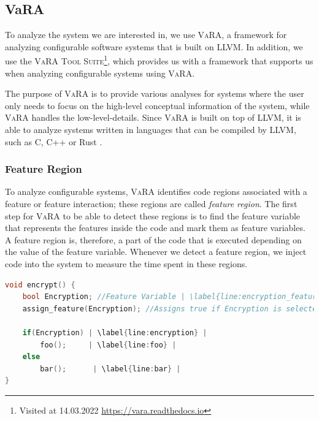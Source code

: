 \subsection{VaRA}\label{VaRA}
To analyze the system we are interested in, we use \textsc{VaRA}, a framework for analyzing configurable software systems that is built on \textsc{LLVM}.
In addition, we use the \textsc{VaRA Tool Suite}\footnote{Visited at 14.03.2022 \url{https://vara.readthedocs.io}}, which provides us with a framework that supports
us when analyzing configurable systems using \textsc{VaRA}.
    
The purpose of \textsc{VaRA} is to provide various analyses for systems where the user only needs to focus on the high-level conceptual information of the 
system, while \textsc{VaRA} handles the low-level-details. 
Since \textsc{VaRA} is built on top of \textsc{LLVM}, it is able to analyze systems written in languages that can be compiled by \textsc{LLVM}, such as C, C++ or Rust \cite{VaRA-Flo}.

\subsubsection{Feature Region}
To analyze configurable systems, \textsc{VaRA} identifies code regions associated with a feature or feature interaction; 
these regions are called \emph{feature region}. 
The first step for \textsc{VaRA} to be able to detect these regions is to find the feature variable that represents the features inside the code and mark them as
feature variables. 
A feature region is, therefore, a part of the code that is executed depending on the value of the feature variable. Whenever we detect a feature region,
we inject code into the system to measure the time spent in these regions.

\lstset{style=myStyle}
\begin{minipage}{\linewidth}
\begin{lstlisting}[caption={Feature region example},language=C++,label={alg:Vara_feature_regions},escapechar=|]
void encrypt() {
    bool Encryption; //Feature Variable | \label{line:encryption_feature_variable} |
    assign_feature(Encryption); //Assigns true if Encryption is selected
    
    if(Encryption) | \label{line:encryption} |
        foo();     | \label{line:foo} |
    else
        bar();      | \label{line:bar} |
}
\end{lstlisting}
\end{minipage}


